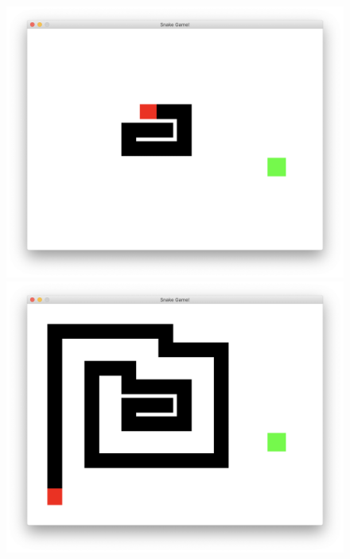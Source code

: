 \documentclass[a4paper]{article}
\begin{document}
\begin{figure}[!hbt]
\begin{minipage}{0.19\textwidth}
    \centering
    \includegraphics[width=\linewidth]{assets/lp1.png}
\end{minipage}\hfill
\begin{minipage}{0.19\textwidth}
    \centering
    \includegraphics[width=\linewidth]{assets/lp2.png}
\end{minipage}
\begin{minipage}{0.19\textwidth}
    \centering

\end{minipage}
\end{figure}
\end{document}
